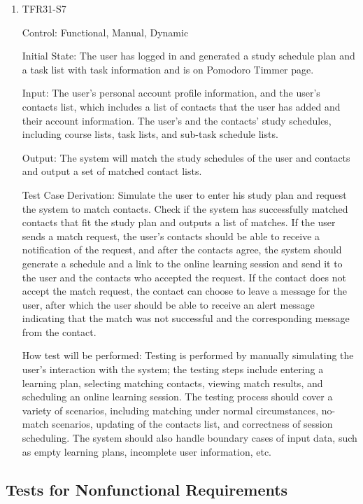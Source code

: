 \documentclass[12pt, titlepage]{article}
\begin{document}
\begin{enumerate}
\item{TFR31-S7\\}

Control: Functional, Manual, Dynamic
					
Initial State: The user has logged in and generated a study schedule plan and a task list with task information and is on Pomodoro Timmer page.
					
Input: The user's personal account profile information, and the user's contacts list, which includes a list of contacts that the user has added and their account information. The user's and the contacts' study schedules, including course lists, task lists, and sub-task schedule lists.
					
Output: The system will match the study schedules of the user and contacts and output a set of matched contact lists.

Test Case Derivation: Simulate the user to enter his study plan and request the system to match contacts. Check if the system has successfully matched contacts that fit the study plan and outputs a list of matches. If the user sends a match request, the user's contacts should be able to receive a notification of the request, and after the contacts agree, the system should generate a schedule and a link to the online learning session and send it to the user and the contacts who accepted the request. If the contact does not accept the match request, the contact can choose to leave a message for the user, after which the user should be able to receive an alert message indicating that the match was not successful and the corresponding message from the contact.
					
How test will be performed: Testing is performed by manually simulating the user's interaction with the system; the testing steps include entering a learning plan, selecting matching contacts, viewing match results, and scheduling an online learning session. The testing process should cover a variety of scenarios, including matching under normal circumstances, no-match scenarios, updating of the contacts list, and correctness of session scheduling. The system should also handle boundary cases of input data, such as empty learning plans, incomplete user information, etc.
\end{enumerate}
\subsection{Tests for Nonfunctional Requirements}
\end{document}
